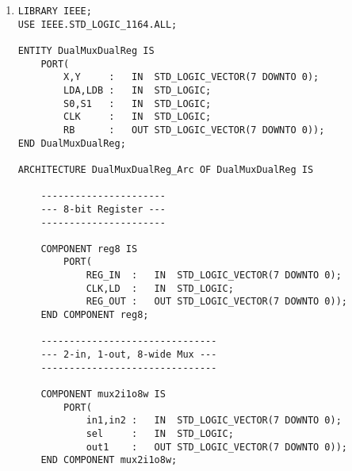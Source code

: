 \begin{enumerate}
\begin{lstlisting}
	COMPONENT decoder1to2 IS
		PORT(
			in1			:	IN	STD_LOGIC;
			out0,out1	:	OUT	STD_LOGIC);
	END COMPONENT decoder1to2;


	----------------------
	--- 8-bit Register ---
	----------------------

	COMPONENT reg8 IS
		PORT(
			REG_IN	:	IN	STD_LOGIC_VECTOR(7 DOWNTO 0);
			CLK,LD	:	IN	STD_LOGIC;
			REG_OUT	:	OUT	STD_LOGIC_VECTOR(7 DOWNTO 0));
	END COMPONENT reg8;

	SIGNAL muxout,regAout,regBout	:	STD_LOGIC_VECTOR(7 DOWNTO 0);
	SIGNAL decout0,decout1			:	STD_LOGIC;

BEGIN

	mux:	mux4i1o8w PORT MAP (
		in0		=>	regBout,
		in1		=>	Z,
		in2		=>	Y,
		in3		=>	X,
		sel		=>	MS,
		out1	=> muxout);

	dec:	decoder1to2 PORT MAP (
		in1		=>	DS,
		out0	=>	decout0,
		out1	=>	decout1);

	regA:	reg8 PORT MAP (
		REG_IN	=>	muxout,
		CLK		=>	CLK,
		LD		=>	decout0,
		REG_OUT	=>	regAout);

	regB:	reg8 PORT MAP (
		REG_IN	=>	regAout,
		CLK		=>	CLK,
		LD		=>	decout1,
		REG_OUT	=>	regBout);

	RA <= regAout;
	RB <= regBout;

END muxdec2r;
	\end{lstlisting}

	\item \begin{lstlisting}
LIBRARY IEEE;
USE IEEE.STD_LOGIC_1164.ALL;

ENTITY DualMuxDualReg IS
	PORT(
		X,Y		:	IN	STD_LOGIC_VECTOR(7 DOWNTO 0);
		LDA,LDB	:	IN	STD_LOGIC;
		S0,S1	:	IN	STD_LOGIC;
		CLK		:	IN	STD_LOGIC;
		RB		:	OUT	STD_LOGIC_VECTOR(7 DOWNTO 0));
END DualMuxDualReg;

ARCHITECTURE DualMuxDualReg_Arc OF DualMuxDualReg IS

	----------------------
	--- 8-bit Register ---
	----------------------

	COMPONENT reg8 IS
		PORT(
			REG_IN	:	IN	STD_LOGIC_VECTOR(7 DOWNTO 0);
			CLK,LD	:	IN	STD_LOGIC;
			REG_OUT	:	OUT	STD_LOGIC_VECTOR(7 DOWNTO 0));
	END COMPONENT reg8;

	-------------------------------
	--- 2-in, 1-out, 8-wide Mux ---
	-------------------------------

	COMPONENT mux2i1o8w IS
		PORT(
			in1,in2	:	IN	STD_LOGIC_VECTOR(7 DOWNTO 0);
			sel		:	IN	STD_LOGIC;
			out1	:	OUT	STD_LOGIC_VECTOR(7 DOWNTO 0));
	END COMPONENT mux2i1o8w;


\end{lstlisting}
\end{enumerate}
